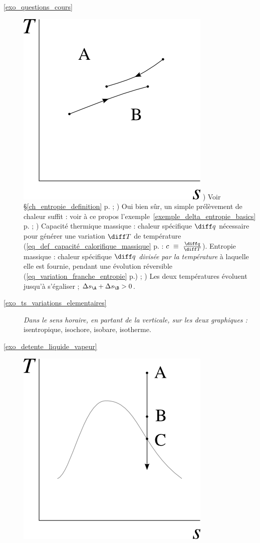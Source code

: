 \exercisesolutionpage
\titreresultats

	\begin{description}
		\item [\ref{exo_questions_cours}]
						\includegraphics[width=\solutiondiagramwidth]{images/exo_sol_ts_tasse.png}
						) Voir \S\ref{ch_entropie_definition} p.\pageref{ch_entropie_definition} ;
						) Oui bien sûr, un simple prélèvement de chaleur suffit : voir à ce propos l’exemple~\ref{exemple_delta_entropie_basics} p.\pageref{exemple_delta_entropie_basics} ;
						) Capacité thermique massique : chaleur spécifique $\diff q$ nécessaire pour générer une variation $\diff T$ de température (\cref{eq_def_capacité_calorifique_massique} p.\pageref{eq_def_capacité_calorifique_massique} : $c\ \equiv \ \frac{\diff q}{\diff T}$). Entropie massique : chaleur spécifique $\diff q$ \emph{divisée par la température} à laquelle elle est fournie, pendant une évolution réversible (\cref{eq_variation_franche_entropie} p.\pageref{eq_variation_franche_entropie}) ;
						) Les deux températures évoluent jusqu’à s’égaliser ; $\Delta s_\A + \Delta s_\B > 0$.
		\item [\ref{exo_ts_variations_elementaires}]
						\tab \textit{Dans le sens horaire, en partant de la verticale, sur les deux graphiques :} isentropique, isochore, isobare, isotherme.
		\item [\ref{exo_detente_liquide_vapeur}]
						\includegraphics[width=\solutiondiagramwidth]{images/exo_sol_ts_detente_eau.png}

\end{description}
